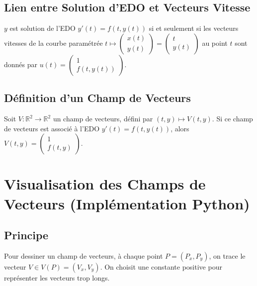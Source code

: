 \documentclass[oneside]{book}
\begin{document}
\subsection{Lien entre Solution d'EDO et Vecteurs Vitesse}

\begin{proposition}
$y$ est solution de l'EDO $y'(t) = f(t, y(t))$ si et seulement si les vecteurs vitesses de la courbe paramétrée $t \mapsto \begin{pmatrix} x(t) \\ y(t) \end{pmatrix} = \begin{pmatrix} t \\ y(t) \end{pmatrix}$ au point $t$ sont donnés par $u(t) = \begin{pmatrix} 1 \\ f(t, y(t)) \end{pmatrix}$.
\end{proposition}

\subsection{Définition d'un Champ de Vecteurs}

\begin{definition}
Soit $V : \mathbb{R}^2 \rightarrow \mathbb{R}^2$ un champ de vecteurs, défini par $(t, y) \mapsto V(t, y)$.
Si ce champ de vecteurs est associé à l'EDO $y'(t) = f(t, y(t))$, alors $V(t, y) = \begin{pmatrix} 1 \\ f(t, y) \end{pmatrix}$.
\end{definition}

\section{Visualisation des Champs de Vecteurs (Implémentation Python)}

\subsection{Principe}

Pour dessiner un champ de vecteurs, à chaque point $P = (P_x, P_y)$, on trace le vecteur $V \in V(P) = (V_x, V_y)$. On choisit une constante positive pour représenter les vecteurs trop longs.
\end{document}
